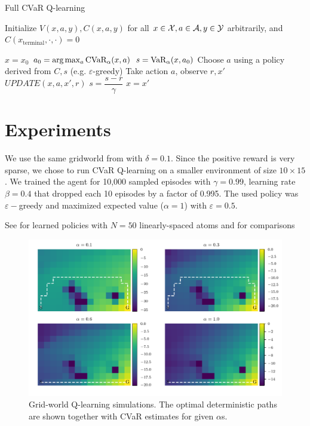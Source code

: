 
\begin{algorithm}
\caption{Full CVaR Q-learning}
\begin{algorithmic}
    \STATE Initialize $V(x, a, y), C(x, a, y)$ for all $x\in\mathcal{X}, a\in\mathcal{A}, y\in\mathcal{Y}$ arbitrarily, and $C(x_\text{terminal}, \cdot, \cdot) = 0$
    
		
	\STATE $x = x_0$
	\STATE $a_0 = \text{arg}\max_a \text{CVaR}_\alpha(x, a)$
	\STATE $s = \text{VaR}_\alpha(x, a_0)$
	\STATE Choose $a$ using a policy derived from $C, s$ (e.g. $\varepsilon$-greedy)
	\STATE Take action $a$, observe $r, x'$
	\STATE $UPDATE(x, a, x', r)$
	\STATE $s = \dfrac{s-r}{\gamma}$
	\STATE $x = x'$
	\ENDWHILE
	
	\ENDFOR
\end{algorithmic}
\end{algorithm}




\section{Experiments}\label{sec:qexperiments}
We use the same gridworld from  with $\delta=0.1$. Since the positive reward is very sparse, we chose to run CVaR Q-learning on a smaller environment of size $10\times15$. We trained the agent for 10,000 sampled episodes with $\gamma=0.99$, learning rate $\beta=0.4$ that dropped each 10 episodes by a factor of 0.995. The used policy was $\varepsilon-$greedy and maximized expected value ($\alpha=1$) with $\varepsilon=0.5$.

See  for learned policies with $N=50$ linearly-spaced atoms and  for comparisons 

\begin{figure}[h]
\center
\includegraphics[width=\linewidth]{gfx/q_optimal_paths.pdf}
\caption{Grid-world Q-learning simulations. The optimal deterministic paths are shown together with CVaR estimates for given $\alpha$s.}
\label{fig:qgrid}
\end{figure}


